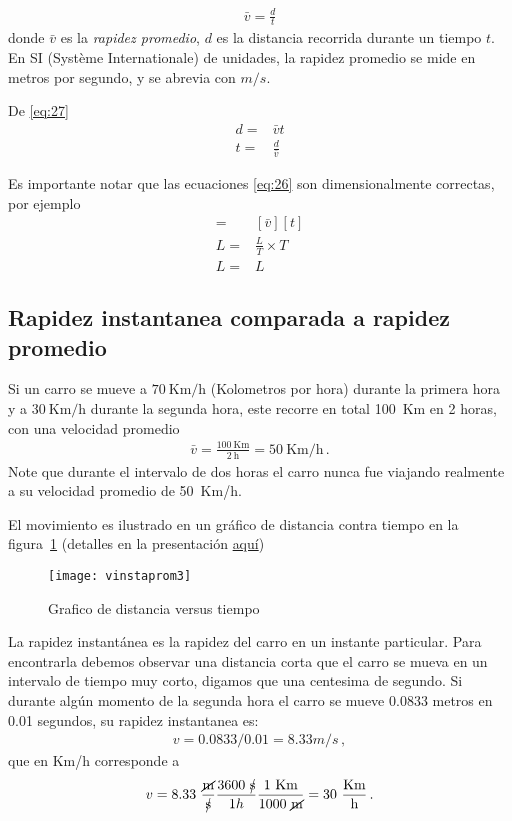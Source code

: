 \begin{align}
  \label{eq:27}
\bar{v}=\frac{d}{t}
\end{align}
donde $\bar{v}$ es la \emph{rapidez promedio}, $d$ es la distancia
recorrida durante un tiempo $t$. En SI (Système Internationale) de
unidades, la rapidez promedio se mide en metros por segundo, y se
abrevia con $m/s$.

De \eqref{eq:27}
\begin{align}
  \label{eq:26}
  d=&\bar{v} t\nonumber\\
  t=&\frac{d}{\bar{v}}
\end{align}

Es importante notar que las ecuaciones \eqref{eq:26} son dimensionalmente correctas, por ejemplo
\begin{align}
  [d]=&  \left[\bar{v}   \right] [t]\nonumber\\
  L=&\frac{L}{T}\times T\nonumber\\
  L=&L
\end{align}

\subsection{Rapidez instantanea comparada a rapidez promedio}

Si un carro se mueve a $70\ \text{Km/h}$ (Kolometros por hora) durante la primera hora y a $30\ \text{Km/h}$
durante la segunda hora, este recorre en total 100~Km en 2 horas, con una velocidad promedio
\begin{align}
  \bar{v}=\frac{100\ \text{Km}}{2\ \text{h}}=50\ \text{Km/h}\,.
\end{align}
Note que durante el intervalo de dos horas el carro nunca fue viajando realmente a su velocidad promedio de 50~Km/h.

El movimiento es ilustrado en un gráfico de distancia contra tiempo en la figura~\ref{fig:vinstaprom3} (detalles en la presentación \href{http://goo.gl/3eqUa}{aquí})

\begin{frame}[plain]
\begin{figure}
  \centering
  \texttt{[image: vinstaprom3]}
  \caption{Grafico de distancia versus tiempo}
  \label{fig:vinstaprom3}
\end{figure}
\end{frame}


La rapidez instantánea es la rapidez del carro en un instante particular. Para encontrarla debemos observar una distancia corta que el carro se mueva en un intervalo de tiempo muy corto, digamos que una centesima de segundo. Si durante algún momento de la segunda hora el carro se mueve 0.0833 metros en 0.01 segundos, su rapidez instantanea es:
\begin{align}
  v=0.0833/0.01=8.33 m/s\,,
\end{align}
que en Km/h corresponde a
\begin{align}
  v=8.33\ \frac{\cancel{\text{m}}}{\cancel{\text{s}}}\frac{3600\ \cancel{\text{s}}}{1h}\frac{1\ \text{Km}}{1000\ \cancel{\text{m}}}=30\ \frac{\text{Km}}{\text{h}}\,.
\end{align}




